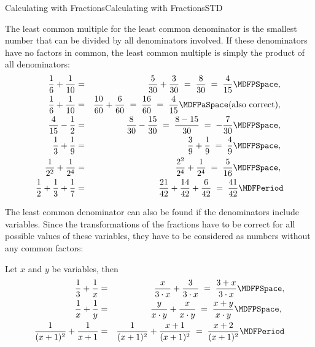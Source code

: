 \begin{MXContent}{Calculating with Fractions}{Calculating with Fractions}{STD}
\begin{MExample}
The least common multiple for the least common denominator is the smallest number that can
be divided by all denominators involved. If these denominators have no factors in common, the 
least common multiple is simply the product of all denominators:
\begin{eqnarray*}
\Mdfrac{1}{6}+\Mdfrac{1}{10} &=& \Mdfrac{5}{30}+\Mdfrac{3}{30} \;=\; \Mdfrac{8}{30} \;=\; \Mdfrac{4}{15}\MDFPSpace , \ \\
\Mdfrac{1}{6}+\Mdfrac{1}{10} &=& \Mdfrac{10}{60}+\Mdfrac{6}{60} \;=\; \Mdfrac{16}{60} \;=\; 
\Mdfrac{4}{15}\MDFPaSpace  \text{(also correct)}, \ \\
\Mdfrac{4}{15}-\Mdfrac1{2} &=& \Mdfrac{8}{30}-\Mdfrac{15}{30} \;=\; \Mdfrac{8-15}{30} \;=\; -\Mdfrac{7}{30}\MDFPSpace , \ \\
\Mdfrac{1}{3}+\Mdfrac{1}{9} &=& \Mdfrac{3}{9}+\Mdfrac19 \;=\; \Mdfrac49\MDFPSpace ,\ \\
\Mdfrac1{2^2}+\Mdfrac1{2^4} & = & \Mdfrac{2^2}{2^4}+\Mdfrac{1}{2^4} \;=\; \Mdfrac{5}{16}\MDFPSpace ,\ \\
\Mdfrac12+\Mdfrac13+\Mdfrac17 & = & \Mdfrac{21}{42}+\Mdfrac{14}{42}+\Mdfrac{6}{42} \;=\; \Mdfrac{41}{42}\MDFPeriod
\end{eqnarray*}
\end{MExample}

The least common denominator can also be found if the denominators include variables. Since
the transformations of the fractions have to be correct for all possible values of these variables, 
they have to be considered as numbers without any common factors:

\begin{MExample}
Let $x$ and $y$ be variables, then
\begin{eqnarray*}
\Mdfrac13+\Mdfrac1x & = & \Mdfrac{x}{3\cdot x}+\Mdfrac{3}{3\cdot x} \; =\; \Mdfrac{3+x}{3\cdot x}\MDFPSpace ,\\
\Mdfrac{1}{x}+\Mdfrac1{y} & = & \Mdfrac{y}{x\cdot y}+\Mdfrac{x}{x\cdot y} \;=\; \Mdfrac{x+y}{x\cdot y}\MDFPSpace ,\ \\
\Mdfrac{1}{(x+1)^2}+\Mdfrac1{x+1} & = & \Mdfrac{1}{(x+1)^2}+\Mdfrac{x+1}{(x+1)^2}\;=\;\Mdfrac{x+2}{(x+1)^2}\MDFPeriod
\end{eqnarray*}
\end{MExample}


\end{MXContent}
